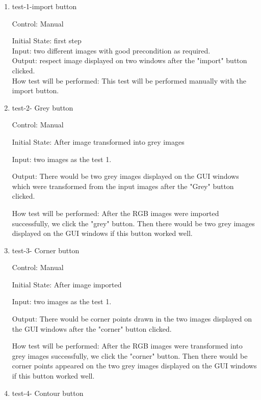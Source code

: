 \documentclass[12pt, titlepage]{article}
\begin{document}
\begin{enumerate}

\item{test-1-import button\\}

Control: Manual 
					
Initial State: first step\\
					
Input: two different images with good precondition as required.\\
					
Output: respect image displayed on two windows after the "import" button clicked.\\


					
How test will be performed: This test will be performed manually with the import button.
					
\item{test-2- Grey button\\}

Control: Manual 
					
Initial State: After image transformed into grey images
					
Input: two images as the test 1.
					
Output: There would be two grey images displayed on the GUI windows which were transformed from the input images after the "Grey" button clicked.


How test will be performed:  After the RGB images were imported successfully, we click the "grey" button. Then there would be two grey images displayed on the GUI windows if this button worked well.
\item{test-3- Corner button\\}

Control: Manual 
					
Initial State: After image imported
					
Input: two images as the test 1.
					
Output: There would be corner points drawn in the two images displayed on the GUI windows after the "corner" button clicked.


How test will be performed:  After the RGB images were transformed into grey images successfully, we click the "corner" button. Then there would be corner points appeared on the two grey images displayed on the GUI windows if this button worked well.
\item{test-4- Contour button\\}


\end{enumerate}
\end{document}
